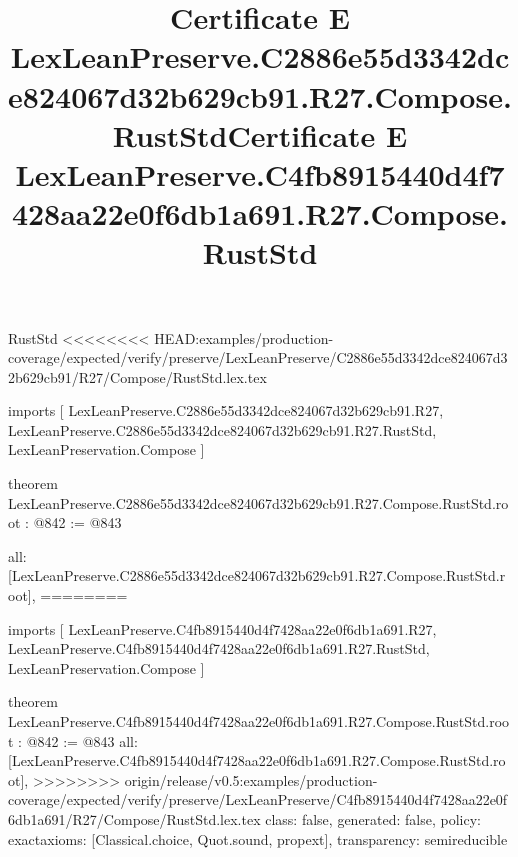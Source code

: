 \begin{lexlean}{RustStd}
<<<<<<<< HEAD:examples/production-coverage/expected/verify/preserve/LexLeanPreserve/C2886e55d3342dce824067d32b629cb91/R27/Compose/RustStd.lex.tex
\title{Certificate E LexLeanPreserve.C2886e55d3342dce824067d32b629cb91.R27.Compose.RustStd}
\begin{coremodule}
imports [
  LexLeanPreserve.C2886e55d3342dce824067d32b629cb91.R27,
  LexLeanPreserve.C2886e55d3342dce824067d32b629cb91.R27.RustStd,
  LexLeanPreservation.Compose
]

theorem LexLeanPreserve.C2886e55d3342dce824067d32b629cb91.R27.Compose.RustStd.root : @842 := @843 {
  all: [LexLeanPreserve.C2886e55d3342dce824067d32b629cb91.R27.Compose.RustStd.root],
========
\title{Certificate E LexLeanPreserve.C4fb8915440d4f7428aa22e0f6db1a691.R27.Compose.RustStd}
\begin{coremodule}
imports [
  LexLeanPreserve.C4fb8915440d4f7428aa22e0f6db1a691.R27,
  LexLeanPreserve.C4fb8915440d4f7428aa22e0f6db1a691.R27.RustStd,
  LexLeanPreservation.Compose
]

theorem LexLeanPreserve.C4fb8915440d4f7428aa22e0f6db1a691.R27.Compose.RustStd.root : @842 := @843 {
  all: [LexLeanPreserve.C4fb8915440d4f7428aa22e0f6db1a691.R27.Compose.RustStd.root],
>>>>>>>> origin/release/v0.5:examples/production-coverage/expected/verify/preserve/LexLeanPreserve/C4fb8915440d4f7428aa22e0f6db1a691/R27/Compose/RustStd.lex.tex
  class: false,
  generated: false,
  policy: exact{axioms: [Classical.choice, Quot.sound, propext]},
  transparency: semireducible
}


\end{coremodule}}
\end{coremodule}
\end{lexlean}
